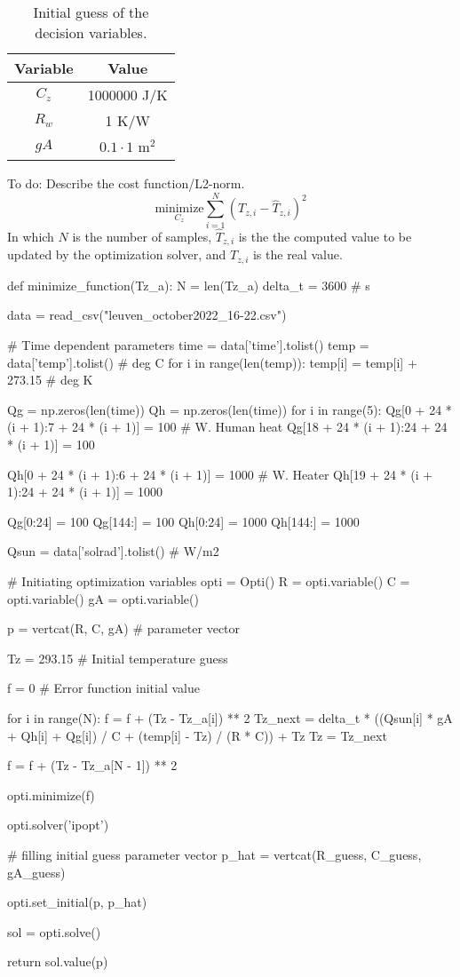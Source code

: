 \begin{table}[H]
\centering
\begin{tabular}{c|c}
Variable & Value\\
\hline
\hline
$C_z$ & 1000000 J/K\\
$R_w$ & 1 K/W\\
$gA$ & $0.1\cdot1$ m$^2$ 
\end{tabular}
\caption{Initial guess of the decision variables.}
\label{tab:initial_guess}
\end{table}

To do: Describe the cost function/L2-norm.
\begin{equation}
\underset{C_z}{\text{minimize}} \sum_{i=1}^{N} (T_{z,i}-\hat{T}_{z,i})^2 
\end{equation}
In which $N$ is the number of samples, $\hat{T}_{z,i}$ is the the computed value to be updated by the optimization solver, and $T_{z,i}$ is the real value. 
\begin{python}
def minimize_function(Tz_a):
    N = len(Tz_a)
    delta_t = 3600  # s

    data = read_csv("leuven_october2022_16-22.csv")

    # Time dependent parameters
    time = data['time'].tolist()
    temp = data['temp'].tolist()  # deg C
    for i in range(len(temp)):
        temp[i] = temp[i] + 273.15  # deg K

    Qg = np.zeros(len(time))
    Qh = np.zeros(len(time))
    for i in range(5):
        Qg[0 + 24 * (i + 1):7 + 24 * (i + 1)] = 100  # W. Human heat 
        Qg[18 + 24 * (i + 1):24 + 24 * (i + 1)] = 100 

        Qh[0 + 24 * (i + 1):6 + 24 * (i + 1)] = 1000  # W. Heater
        Qh[19 + 24 * (i + 1):24 + 24 * (i + 1)] = 1000

    Qg[0:24] = 100
    Qg[144:] = 100
    Qh[0:24] = 1000
    Qh[144:] = 1000

    Qsun = data['solrad'].tolist()  # W/m2

    # Initiating optimization variables
    opti = Opti()
    R = opti.variable()
    C = opti.variable()
    gA = opti.variable()

    p = vertcat(R, C, gA)  # parameter vector

    Tz = 293.15  # Initial temperature guess

    f = 0   # Error function initial value

    for i in range(N):
        f = f + (Tz - Tz_a[i]) ** 2
        Tz_next = delta_t * ((Qsun[i] * gA + Qh[i] + Qg[i]) / C + (temp[i] - Tz) / (R * C)) + Tz
        Tz = Tz_next
        
    f = f + (Tz - Tz_a[N - 1]) ** 2

    opti.minimize(f)

    opti.solver('ipopt')

    # filling initial guess parameter vector
    p_hat = vertcat(R_guess, C_guess, gA_guess)

    opti.set_initial(p, p_hat)

    sol = opti.solve()

    return sol.value(p)
\end{python}


